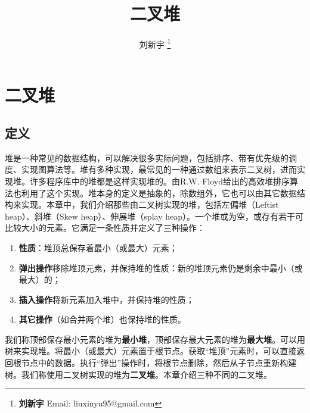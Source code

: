 \documentclass[b5paper]{ctexart}
\begin{document}
\title{二叉堆}

\author{刘新宇
\thanks{{\bfseries 刘新宇 } \newline
  Email: liuxinyu95@gmail.com \newline}
  }

\maketitle
\fi


\ifx\wholebook\relax
\chapter{二叉堆}
\fi

\section{定义}
\label{introduction} 

堆是一种常见的数据结构，可以解决很多实际问题，包括排序、带有优先级的调度、实现图算法等\cite{wiki-heap}。堆有多种实现，最常见的一种通过数组来表示二叉树\cite{CLRS}，进而实现堆。许多程序库中的堆都是这样实现堆的。由R.W. Floyd给出的高效堆排序算法也利用了这个实现\cite{wiki-heapsort}\cite{rosetta-heapsort}。堆本身的定义是抽象的，除数组外，它也可以由其它数据结构来实现。本章中，我们介绍那些由二叉树实现的堆，包括左偏堆（Leftist heap）、斜堆（Skew heap）、伸展堆（splay heap）\cite{okasaki-book}。一个堆或为空，或存有若干可比较大小的元素。它满足一条性质并定义了三种操作：

\begin{enumerate}
\item \textbf{性质}：堆顶总保存着最小（或最大）元素；
\item \textbf{弹出操作}移除堆顶元素，并保持堆的性质：新的堆顶元素仍是剩余中最小（或最大）的；
\item \textbf{插入操作}将新元素加入堆中，并保持堆的性质；
\item \textbf{其它操作}（如合并两个堆）也保持堆的性质。
\end{enumerate}

我们称顶部保存最小元素的堆为\textbf{最小堆}，顶部保存最大元素的堆为\textbf{最大堆}。可以用树来实现堆。将最小（或最大）元素置于根节点。获取“堆顶”元素时，可以直接返回根节点中的数据。执行“弹出”操作时，将根节点删除，然后从子节点重新构建树。我们称使用二叉树实现的堆为\textbf{二叉堆}。本章介绍三种不同的二叉堆。
\end{document}
